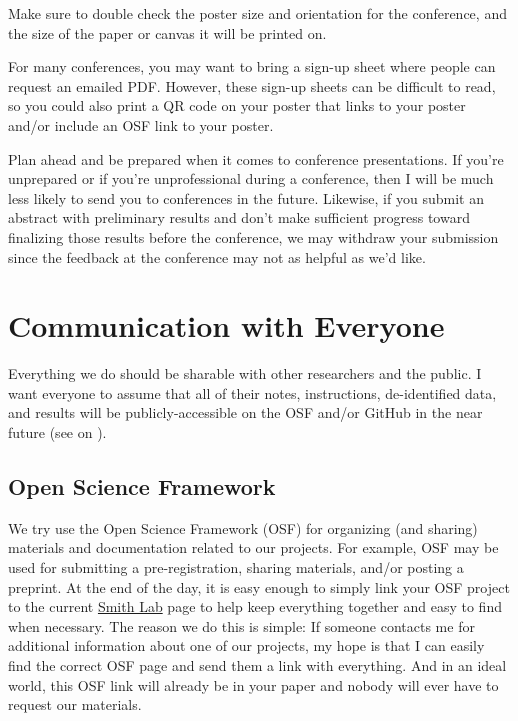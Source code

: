 \documentclass[letterpaper,11pt,oneside]{memoir}
\begin{document}
Make sure to double check the poster size and orientation for the conference, and the size of the paper or canvas it will be printed on.

For many conferences, you may want to bring a sign-up sheet where people can request an emailed PDF. However, these sign-up sheets can be difficult to read, so you could also print a QR code on your poster that links to your poster and/or include an OSF link to your poster.

\begin{shaded}
\noindent Plan ahead and be prepared when it comes to conference presentations. If you're unprepared or if you're unprofessional during a conference, then I will be much less likely to send you to conferences in the future. Likewise, if you submit an abstract with preliminary results and don't make sufficient progress toward finalizing those results before the conference, we may withdraw your submission since the feedback at the conference may not as helpful as we'd like.
\end{shaded}


\section{Communication with Everyone}
Everything we do should be sharable with other researchers and the public. I want everyone to assume that all of their notes, instructions, de-identified data, and results will be publicly-accessible on the OSF and/or GitHub in the near future (see  on ). 

\subsection{Open Science Framework}
We try use the Open Science Framework (OSF) for organizing (and sharing) materials and documentation related to our projects. For example, OSF may be used for submitting a pre-registration, sharing materials, and/or posting a preprint. At the end of the day, it is easy enough to simply link your OSF project to the current \href{https://osf.io/myxet/}{Smith Lab} page to help keep everything together and easy to find when necessary. The reason we do this is simple: If someone contacts me for additional information about one of our projects, my hope is that I can easily find the correct OSF page and send them a link with everything. And in an ideal world, this OSF link will already be in your paper and nobody will ever have to request our materials. 
\end{document}
